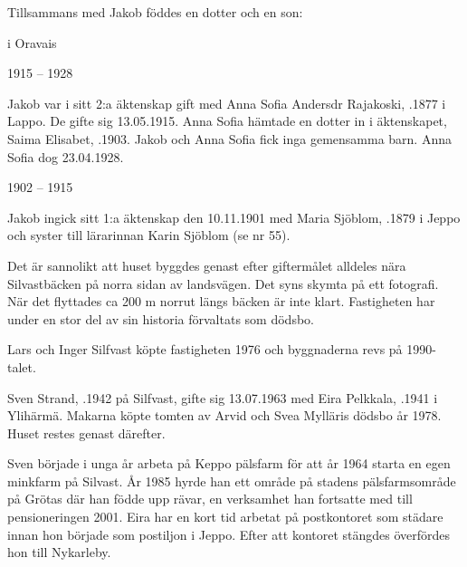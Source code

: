 Tillsammans med Jakob föddes en dotter och en son:
  \begin{jhchildren}
    \item {} i Oravais
    \item {}
\end{jhchildren}


1915 – 1928

Jakob var i sitt 2:a äktenskap gift  med Anna Sofia Andersdr Rajakoski, .1877 i Lappo. De gifte sig 13.05.1915. Anna Sofia hämtade en dotter in i äktenskapet, Saima Elisabet, .1903. Jakob och Anna Sofia fick inga gemensamma barn. Anna Sofia dog  23.04.1928.

1902 – 1915

Jakob ingick sitt 1:a äktenskap den 10.11.1901 med Maria Sjöblom, .1879 i Jeppo och syster till lärarinnan Karin Sjöblom (se nr 55).
\begin{jhchildren}
  \item {}
  \item {}
  \item {}
  \item {}
  \item {}
\end{jhchildren}

Det är sannolikt att huset byggdes genast efter giftermålet alldeles nära Silvastbäcken på norra sidan av landsvägen. Det syns skymta på ett fotografi. När det flyttades ca 200 m norrut längs bäcken är inte klart. Fastigheten har under en stor del av sin historia förvaltats som dödsbo.

Lars och Inger Silfvast köpte fastigheten 1976 och byggnaderna revs på 1990-talet.




Sven Strand, .1942 på Silfvast, gifte sig 13.07.1963 med Eira Pelkkala, .1941 i Ylihärmä. Makarna köpte tomten av Arvid och Svea Mylläris dödsbo år 1978. Huset restes genast därefter.


Sven började i unga år arbeta på Keppo pälsfarm för att år 1964 starta en egen minkfarm på Silvast. År 1985 hyrde han ett område på stadens pälsfarmsområde på Grötas där han födde upp rävar, en verksamhet han fortsatte med till pensioneringen 2001. Eira har en kort tid arbetat på postkontoret som städare innan  hon började som postiljon i Jeppo. Efter att kontoret  stängdes  överfördes hon till Nykarleby.

